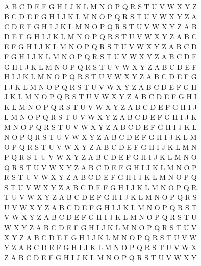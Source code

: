 \documentclass[a4paper,twocolumn]{article}
\begin{document}
\centering
\scriptsize
A B C D E F G H I J K L M N O P Q R S T U V W X Y Z \\
B C D E F G H I J K L M N O P Q R S T U V W X Y Z A \\
C D E F G H I J K L M N O P Q R S T U V W X Y Z A B \\
D E F G H I J K L M N O P Q R S T U V W X Y Z A B C \\
E F G H I J K L M N O P Q R S T U V W X Y Z A B C D \\
F G H I J K L M N O P Q R S T U V W X Y Z A B C D E \\
G H I J K L M N O P Q R S T U V W X Y Z A B C D E F \\
H I J K L M N O P Q R S T U V W X Y Z A B C D E F G \\
I J K L M N O P Q R S T U V W X Y Z A B C D E F G H \\
J K L M N O P Q R S T U V W X Y Z A B C D E F G H I \\
K L M N O P Q R S T U V W X Y Z A B C D E F G H I J \\
L M N O P Q R S T U V W X Y Z A B C D E F G H I J K \\
M N O P Q R S T U V W X Y Z A B C D E F G H I J K L \\
N O P Q R S T U V W X Y Z A B C D E F G H I J K L M \\
O P Q R S T U V W X Y Z A B C D E F G H I J K L M N \\
P Q R S T U V W X Y Z A B C D E F G H I J K L M N O \\
Q R S T U V W X Y Z A B C D E F G H I J K L M N O P \\
R S T U V W X Y Z A B C D E F G H I J K L M N O P Q \\
S T U V W X Y Z A B C D E F G H I J K L M N O P Q R \\
T U V W X Y Z A B C D E F G H I J K L M N O P Q R S \\
U V W X Y Z A B C D E F G H I J K L M N O P Q R S T \\
V W X Y Z A B C D E F G H I J K L M N O P Q R S T U \\
W X Y Z A B C D E F G H I J K L M N O P Q R S T U V \\
X Y Z A B C D E F G H I J K L M N O P Q R S T U V W \\
Y Z A B C D E F G H I J K L M N O P Q R S T U V W X \\
Z A B C D E F G H I J K L M N O P Q R S T U V W X Y \\
\end{document}
